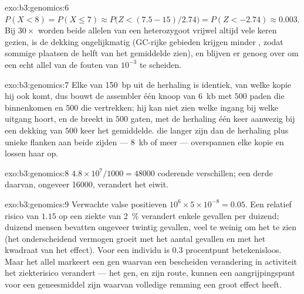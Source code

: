 \begin{solution}{exo:b3:genomics:6}
$P(X < 8) = P(X \le 7) \approx P\bigl(Z < (7.5 - 15)/2.74\bigr) =
P(Z < -2.74) \approx 0.003$. Bij $30\times$ worden beide allelen van
een heterozygoot vrijwel altijd vele keren gezien, is de dekking
ongelijkmatig (GC-rijke gebieden krijgen minder , zodat sommige
plaatsen de helft van het gemiddelde zien), en blijven er genoeg 
over om een echt allel van de fouten van $10^{-3}$ te scheiden.
\end{solution}

\begin{solution}{exo:b3:genomics:7}
Elke  van \qty{150}{bp} uit de herhaling is identiek, van welke
kopie hij ook komt, dus bouwt de assembler één knoop van \qty{6}{kb}
met $500$ paden die binnenkomen en $500$ die vertrekken; hij kan niet
zien welke ingang bij welke uitgang hoort, en de  breekt in
$500$ gaten, met de herhaling één keer aanwezig bij een dekking van
$500$ keer het gemiddelde.  die langer zijn dan de herhaling plus
unieke flanken aan beide zijden --- \qty{8}{kb} of meer --- overspannen
elke kopie en lossen haar op.
\end{solution}

\begin{solution}{exo:b3:genomics:8}
$4.8\times 10^{7}/1000 = \num{48000}$ coderende verschillen; een derde
daarvan, ongeveer \num{16000}, verandert het eiwit.
\end{solution}

\begin{solution}{exo:b3:genomics:9}
Verwachte valse positieven $10^{6}\times 5\times 10^{-8} = 0.05$. Een
relatief risico van $1.15$ op een ziekte van \qty{2}{\%} verandert
enkele gevallen per duizend; duizend mensen bevatten ongeveer twintig
gevallen, veel te weinig om het te zien (het onderscheidend vermogen
groeit met het aantal gevallen en met het kwadraat van het effect). Voor
een individu is $0.3$ procentpunt betekenisloos. Maar het allel
markeert een gen waarvan een bescheiden verandering in activiteit het
ziekterisico verandert --- het gen, en zijn route, kunnen een
aangrijpingspunt voor een geneesmiddel zijn waarvan volledige remming
een groot effect heeft.
\end{solution}

